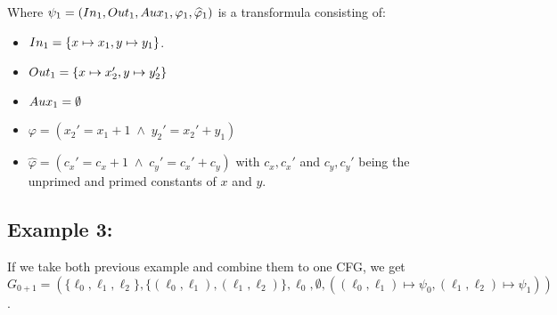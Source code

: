 \documentclass{article}
\begin{document}
	Where $\psi_1 = (In_1, Out_1, Aux_1, \varphi_1, \widehat{\varphi}_1)$ is a transformula consisting of: 
	\begin{itemize}
		\item $In_1 = \{x \mapsto x_1, y \mapsto y_1 \}$.
		\item $Out_1 = \{ x \mapsto x_2', y \mapsto y_2' \}$
		\item $Aux_1 = \emptyset $
		\item $	\varphi = ( x_{2}' = x_{1} + 1 \; \land \; y_{2}' = x_{2}' + y_{1} ) $
		\item $\widehat{\varphi} = ( c_{x}' = c_x + 1 \;\land\; c_{y}' = c_{x}' + c_y ) $ with $c_x, c_x'$ and $c_y, c_y'$ being the unprimed and primed constants of $x$ and $y$.
	\end{itemize}
    
	
	\subsection*{Example 3:}
	If we take both previous example and combine them to one CFG, we get \\ $G_{0+1} = (\{ \ell_0, \ell_1, \ell_2\}, \{ (\ell_0, \ell_1), (\ell_1, \ell_2)\}, \ell_0, \emptyset, ((\ell_0, \ell_1) \mapsto \psi_0, (\ell_1, \ell_2) \mapsto \psi_1))$.
	
	\bigskip
\end{document}
